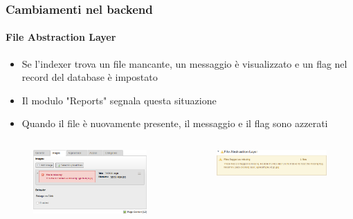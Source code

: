\begin{frame}[fragile]
	\frametitle{Cambiamenti nel backend}
	\framesubtitle{File Abstraction Layer}

	\begin{itemize}
		\item Se l'indexer trova un file mancante, un messaggio è visualizzato e un flag nel record del database è impostato
		\item Il modulo "Reports" segnala questa situazione
		\item Quando il file è nuovamente presente, il messaggio e il flag sono azzerati
	\end{itemize}

	\begin{columns}[T]

		\begin{column}{.5\textwidth}
			\begin{figure}
				\includegraphics[width=0.95\linewidth]{Images/BackendChanges/FalMissingFileContentElement.png}
			\end{figure}
		\end{column}

		\begin{column}{.5\textwidth}
			\begin{figure}
				\includegraphics[width=0.95\linewidth]{Images/BackendChanges/FalMissingFileReportsModule.png}
			\end{figure}
		\end{column}

	\end{columns}

\end{frame}

